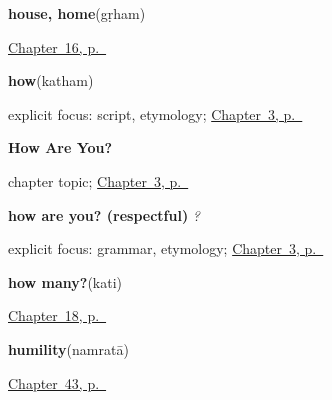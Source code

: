 \noindent\begin{minipage}[t]{\linewidth}
\raggedright
\textbf{house, home}\enspace\emph{}\enspace(gṛham)\par
\footnotesize \hyperref[ch:sa-places]{Chapter~16, p.~\pageref*{ch:sa-places}}
\end{minipage}\par\smallskip

\noindent\begin{minipage}[t]{\linewidth}
\raggedright
\textbf{how}\enspace\emph{}\enspace(katham)\par
\footnotesize explicit focus: script, etymology; \hyperref[ch:responding]{Chapter~3, p.~\pageref*{ch:responding}}
\end{minipage}\par\smallskip

\noindent\begin{minipage}[t]{\linewidth}
\raggedright
\textbf{How Are You?}\par
\footnotesize chapter topic; \hyperref[ch:responding]{Chapter~3, p.~\pageref*{ch:responding}}
\end{minipage}\par\smallskip

\noindent\begin{minipage}[t]{\linewidth}
\raggedright
\textbf{how are you? (respectful)}\enspace\emph{  ?}\par
\footnotesize explicit focus: grammar, etymology; \hyperref[ch:responding]{Chapter~3, p.~\pageref*{ch:responding}}
\end{minipage}\par\smallskip

\noindent\begin{minipage}[t]{\linewidth}
\raggedright
\textbf{how many?}\enspace\emph{}\enspace(kati)\par
\footnotesize \hyperref[ch:sa-asking]{Chapter~18, p.~\pageref*{ch:sa-asking}}
\end{minipage}\par\smallskip

\noindent\begin{minipage}[t]{\linewidth}
\raggedright
\textbf{humility}\enspace\emph{}\enspace(namratā)\par
\footnotesize \hyperref[ch:sa-good-manners]{Chapter~43, p.~\pageref*{ch:sa-good-manners}}
\end{minipage}\par\smallskip

